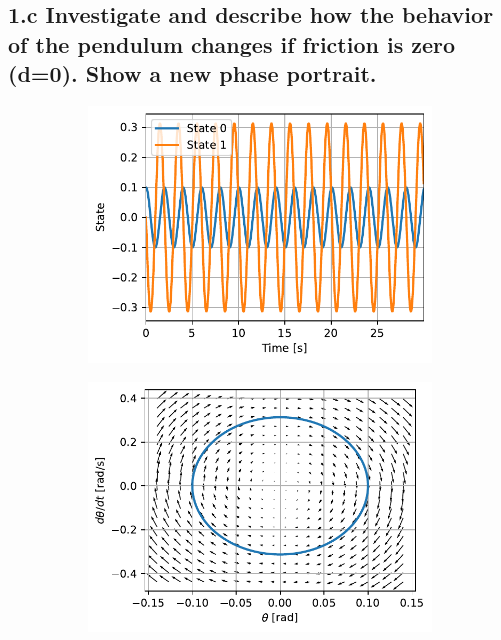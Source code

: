 \documentclass{cmc}
\begin{document}
\subsection*{1.c Investigate and describe how the behavior of the pendulum
  changes if friction is zero (d=0).  Show a new phase portrait.}


\begin{figure}[H]
  \centering
  \begin{subfigure}[b]{0.49\textwidth}
    { \centering
      \includegraphics[width=\textwidth]{figures/State_without_damping_(x0=[0dot1,_0])}
      \label{fig:pendulum-no-friction-state}
    }
    \caption{}
  \end{subfigure}
  \begin{subfigure}[b]{0.49\textwidth}
    { \centering
      \includegraphics[width=\textwidth]{figures/Phase_without_damping_(x0=[0dot1,_0])}
      \label{fig:pendulum-no-friction-phase}
    }
    \caption{}
  \end{subfigure}
  \caption{}
  \label{fig:pendulum-no-friction}
\end{figure}
\end{document}
